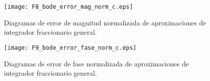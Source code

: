 \begin{figure}[hbtp]
	\caption{Diagramas de error de magnitud normalizada de aproximaciones de integrador fraccionario general.}
	\centering
	\texttt{[image: F8\_bode\_error\_mag\_norm\_c.eps]}
	\label{fig:analisis_error_mag_norm}
\end{figure}

\begin{figure}[hbtp]
	\caption{Diagramas de error de fase normalizada de aproximaciones de integrador fraccionario general.}
	\centering
	\texttt{[image: F9\_bode\_error\_fase\_norm\_c.eps]}
	\label{fig:analisis_error_fase_norm}
\end{figure}